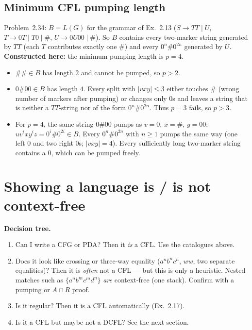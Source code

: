 \documentclass[11pt,a4paper]{article}
\begin{document}
\subsection{Minimum CFL pumping length}

Problem~2.34: $B=L(G)$ for the grammar of Ex.~2.13
($S\to TT\mid U$, $T\to 0T\mid T0\mid\#$, $U\to 0U00\mid\#$).
So $B$ contains every two-marker string generated by $TT$
(each $T$ contributes exactly one $\#$) and every
$0^n\#0^{2n}$ generated by $U$. \textbf{Constructed here:} the
minimum pumping length is $p=4$.
\begin{itemize}[nosep]
  \item $\#\#\in B$ has length $2$ and cannot be pumped, so
        $p>2$.
  \item $0\#00\in B$ has length $4$. Every split with
        $|vxy|\le 3$ either touches $\#$ (wrong number of
        markers after pumping) or changes only $0$s and leaves a
        string that is neither a $TT$-string nor of the form
        $0^n\#0^{2n}$. Thus $p=3$ fails, so $p>3$.
  \item For $p=4$, the same string $0\#00$ pumps as
        $v=0$, $x=\#$, $y=00$: $uv^ixy^iz=0^i\#0^{2i}\in B$.
        Every $0^n\#0^{2n}$ with $n\ge 1$ pumps the same way
        (one left $0$ and two right $0$s; $|vxy|=4$). Every
        sufficiently long two-marker string contains a $0$,
        which can be pumped freely.
\end{itemize}

\section{Showing a language is / is not context-free}
\label{type:cfl-decide}

\textbf{Decision tree.}
\begin{enumerate}
  \item Can I write a CFG or PDA? Then it \emph{is} a CFL.
        Use the catalogues above.
  \item Does it look like crossing or three-way equality
        ($a^nb^nc^n$, $ww$, two separate equalities)? Then it is
        \emph{often} not a CFL --- but this is only a heuristic.
        Nested matches such as $\{a^nb^mc^md^n\}$ \emph{are}
        context-free (one stack). Confirm with a pumping or
        $A\cap R$ proof.
  \item Is it regular? Then it is a CFL automatically (Ex.~2.17).
  \item Is it a CFL but maybe not a DCFL? See the next section.
\end{enumerate}
\end{document}
